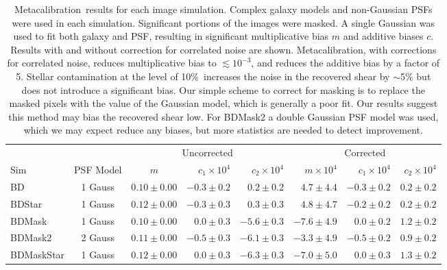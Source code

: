 \documentclass[usegraphicx,usenatbib]{mn2e}
\newcommand{\Mcal}{Metacalibration}
\newcommand{\nsimNstarperc}{10\%}
\begin{document}
\begin{table}
    \centering
    \caption{\Mcal\ results for each image simulation.  Complex galaxy models
        and non-Gaussian PSFs were used in each simulation.  Significant
        portions of the images were masked.  A single Gaussian was used
    to fit both galaxy and PSF, resulting in significant multiplicative 
    bias $m$ and additive biases $c$.  Results with and without correction
    for correlated noise are shown.  \Mcal, with corrections for correlated noise,
    reduces multiplicative bias to $\lesssim 10^{-3}$, and reduces the additive
    bias by a factor of 5.  
    Stellar contamination at the level of \nsimNstarperc\ increases
    the noise in the recovered shear by $\sim$5\% but does not introduce 
    a significant bias.  
    Our simple scheme to correct for masking is to
    replace the masked pixels with the value of the Gaussian model, which is generally
    a poor fit.  Our results suggest this method may bias the recovered shear low.
    For BDMask2 a double Gaussian PSF model was used, which we may expect reduce any biases, but
    more statistics are needed to detect improvement.
    \label{tab:results}}
    \begin{tabular}{ |l|  |c| c|r|r|  r|r|r|}
        \hline
        & & \multicolumn{3}{c}{Uncorrected} & \multicolumn{3}{c}{Corrected} \\
        Sim & PSF Model & $m$ & $c_1 \times 10^4$ & $c_2 \times 10^4$ & $m \times 10^{4}$ & $c_1 \times 10^4$ & $c_2 \times 10^4$ \\
        \hline
        BD              & 1 Gauss & $0.10 \pm 0.00$ & $-0.3 \pm 0.2$ & $0.2 \pm 0.2$ & $ 4.7 \pm 4.4$ & $-0.3 \pm 0.2$ & $0.2 \pm 0.2$  \\
        BDStar          & 1 Gauss & $0.12 \pm 0.00$ & $-0.3 \pm 0.3$ & $0.3 \pm 0.3$ & $ 4.8 \pm 4.7$ & $-0.2 \pm 0.2$ & $0.2 \pm 0.2$  \\
        BDMask          & 1 Gauss & $0.10 \pm 0.00$ & $0.0 \pm 0.3$ & $-5.6 \pm 0.3$ & $-7.6 \pm 4.9$ & $0.0 \pm 0.2$ & $1.2 \pm 0.2$  \\
        BDMask2         & 2 Gauss & $0.11 \pm 0.00$ & $-0.5 \pm 0.3$ & $-6.1 \pm 0.3$ & $-3.3 \pm 4.9$ & $-0.5 \pm 0.2$ & $0.9 \pm 0.2$  \\
        BDMaskStar      & 1 Gauss & $0.12 \pm 0.00$ & $0.0 \pm 0.3$ & $-6.3 \pm 0.3$ & $-7.0 \pm 5.0$ & $0.0 \pm 0.3$ & $1.3 \pm 0.2$  \\
    \end{tabular}
\end{table}
\end{document}
